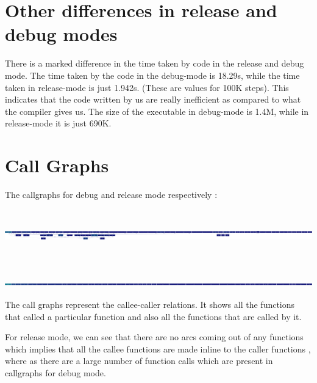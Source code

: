 \documentclass[english]{article}
\begin{document}
\section{Other differences in release and debug modes}
There is a marked difference in the time taken by code in the release and debug mode. The time taken by the code in the debug-mode is 18.29s, while the time taken in release-mode is just 1.942s. (These are values for 100K steps). This indicates that the code written by us are really inefficient as compared to what the compiler gives us.
\newline
The size of the executable in debug-mode is 1.4M, while in release-mode it is just 690K. 


\section{Call Graphs ~\cite{Gprof2Dot}}
The callgraphs for debug and release mode respectively :
\newline
\includegraphics[width=20cm, height=3cm]{doc/debug.png}
\newline
\newline
\includegraphics[width=20cm, height=1cm]{doc/release.png}
\newline
The call graphs represent the callee-caller relations. It shows all the functions that called a particular function 
and also all the functions that are called by it.

For release mode, we can see that there are no arcs coming out of
any functions which implies that all the callee functions are made
inline to the caller functions , where as there are a large number
of function calls which are present in callgraphs for debug mode.

{}

\end{document}
